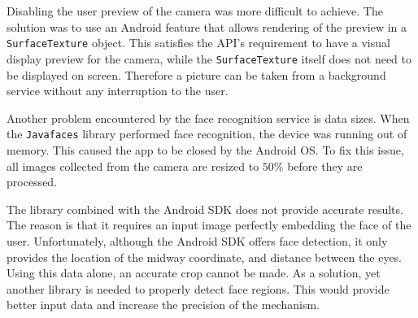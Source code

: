Disabling the user preview of the camera was more difficult to achieve. The solution was to use an Android feature that allows rendering of the preview in a {\tt SurfaceTexture} object. This satisfies the API's requirement to have a visual display preview for the camera, while the {\tt SurfaceTexture} itself does not need to be displayed on screen. Therefore a picture can be taken from a background service without any interruption to the user.

Another problem encountered by the face recognition service is data sizes. When the {\tt Javafaces} library performed face recognition, the device was running out of memory. This caused the app to be closed by the Android OS. To fix this issue, all images collected from the camera are resized to $50\%$ before they are processed.

The library combined with the Android SDK does not provide accurate results. The reason is that it requires an input image perfectly embedding the face of the user. Unfortunately, although the Android SDK offers face detection, it only provides the location of the midway coordinate, and distance between the eyes. Using this data alone, an accurate crop cannot be made. As a solution, yet another library is needed to properly detect face regions. This would provide better input data and increase the precision of the mechanism.

